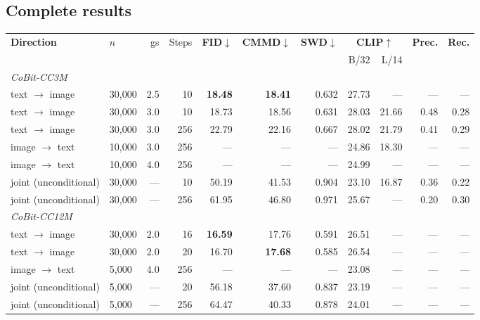\subsection{Complete results}
\label{app:image:headline-full}

\begin{table}[tb]
\centering
\footnotesize
\setlength{\tabcolsep}{3.5pt}
\begin{tabular}{llrrrrrrrrr}
\toprule
\textbf{Direction} & $n$ & gs & Steps & \textbf{FID}$\downarrow$ & \textbf{CMMD}$\downarrow$ & \textbf{SWD}$\downarrow$
& \multicolumn{2}{c}{\textbf{CLIP}$\uparrow$} & \textbf{Prec.} & \textbf{Rec.} \\
\cmidrule(lr){8-9}
& & & & & & & B/32 & L/14 & & \\
\midrule
\multicolumn{11}{l}{\emph{CoBit-CC3M}}\\
text $\rightarrow$ image & 30{,}000 & 2.5 & 10 & \textbf{18.48} & \textbf{18.41} & 0.632 & 27.73 & --- & --- & --- \\
text $\rightarrow$ image & 30{,}000 & 3.0 & 10 & 18.73 & 18.56 & 0.631 & 28.03 & 21.66 & 0.48 & 0.28 \\
text $\rightarrow$ image & 30{,}000 & 3.0 & 256 & 22.79 & 22.16 & 0.667 & 28.02 & 21.79 & 0.41 & 0.29 \\
image $\rightarrow$ text & 10{,}000 & 3.0 & 256 & --- & --- & --- & 24.86 & 18.30 & --- & --- \\
image $\rightarrow$ text & 10{,}000 & 4.0 & 256 & --- & --- & --- & 24.99 & --- & --- & --- \\
joint (unconditional) & 30{,}000 & --- & 10 & 50.19 & 41.53 & 0.904 & 23.10 & 16.87 & 0.36 & 0.22 \\
joint (unconditional) & 30{,}000 & --- & 256 & 61.95 & 46.80 & 0.971 & 25.67 & --- & 0.20 & 0.30 \\
\midrule
\multicolumn{11}{l}{\emph{CoBit-CC12M}}\\
text $\rightarrow$ image & 30{,}000 & 2.0 & 16 & \textbf{16.59} & 17.76 & 0.591 & 26.51 & --- & --- & --- \\
text $\rightarrow$ image & 30{,}000 & 2.0 & 20 & 16.70 & \textbf{17.68} & 0.585 & 26.54 & --- & --- & --- \\
image $\rightarrow$ text & 5{,}000 & 4.0 & 256 & --- & --- & --- & 23.08 & --- & --- & --- \\
joint (unconditional) & 5{,}000 & --- & 20 & 56.18 & 37.60 & 0.837 & 23.19 & --- & --- & --- \\
joint (unconditional) & 5{,}000 & --- & 256 & 64.47 & 40.33 & 0.878 & 24.01 & --- & --- & --- \\

\end{tabular}
\end{table}
